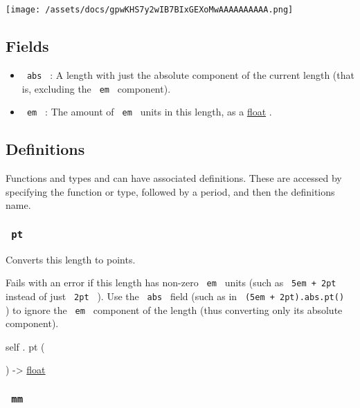 \texttt{[image: /assets/docs/gpwKHS7y2wIB7BIxGEXoMwAAAAAAAAAA.png]}

\subsection{Fields}\label{fields}

\begin{itemize}
\tightlist
\item
  \texttt{\ abs\ } : A length with just the absolute component of the
  current length (that is, excluding the \texttt{\ em\ } component).
\item
  \texttt{\ em\ } : The amount of \texttt{\ em\ } units in this length,
  as a \href{/docs/reference/foundations/float/}{float} .
\end{itemize}

\subsection{\texorpdfstring{{ Definitions
}}{ Definitions }}\label{definitions}

\label{definitions-tooltip}
Functions and types and can have associated definitions. These are
accessed by specifying the function or type, followed by a period, and
then the definition\textquotesingle s name.

\subsubsection{\texorpdfstring{\texttt{\ pt\ }}{ pt }}\label{definitions-pt}

Converts this length to points.

Fails with an error if this length has non-zero \texttt{\ em\ } units
(such as \texttt{\ 5em\ +\ 2pt\ } instead of just \texttt{\ 2pt\ } ).
Use the \texttt{\ abs\ } field (such as in
\texttt{\ (5em\ +\ 2pt).abs.pt()\ } ) to ignore the \texttt{\ em\ }
component of the length (thus converting only its absolute component).

self { . } { pt } (

) -\textgreater{} \href{/docs/reference/foundations/float/}{float}

\subsubsection{\texorpdfstring{\texttt{\ mm\ }}{ mm }}\label{definitions-mm}

